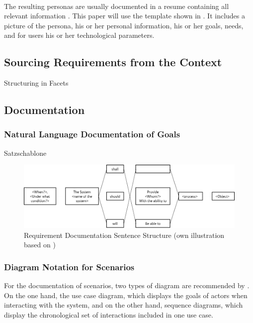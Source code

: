 \paragraph{} The resulting personas are usually documented in a resume containing all relevant information \parencites[cf.][40]{Robier.2016}[cf.][]{Platt.2016}. This paper will use the template shown in . It includes a picture of the persona, his or her personal information, his or her goals, needs, and for users his or her technological parameters.


\subsection{Sourcing Requirements from the Context}
Structuring in Facets
\clearpage
\subsection{Documentation}
\subsubsection{Natural Language Documentation of Goals}
Satzschablone
\begin{figure}[H]
    \centering
    \includegraphics[width=\textwidth]{img/SentenceStructure.png}
    \caption{Requirement Documentation Sentence Structure (own illustration based on \cite[246]{Pohl.2007})}
    \label{fig:sentencestructure}
\end{figure}
\clearpage
\subsubsection{Diagram Notation for Scenarios}
For the documentation of scenarios, two types of diagram are recommended by \textcite[299]{Pohl.2007}. On the one hand, the use case diagram, which displays the goals of actors when interacting with the system, and on the other hand, sequence diagrams, which display the chronological set of interactions included in one use case.

